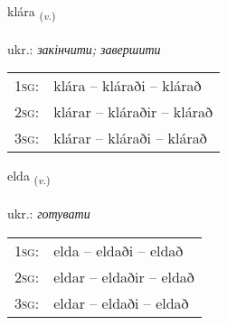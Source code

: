 \documentclass[frontgrid, backgrid]{flacards}\usepackage[]{graphicx}\usepackage[]{xcolor}
\begin{document}
\renewcommand{\flhead}{\vskip5pt \fboxsep=0pt {\small\bfseries\footnotesize Sagnorð | дієслово}}
\renewcommand{\fcfoot}{\vskip5pt \fboxsep=0pt \hspace{2pt}{\small\bfseries\footnotesize 2K}}

\renewcommand{\blhead}{\vskip5pt {\small\bfseries\footnotesize Sagnorð | дієслово }}
\renewcommand{\bcfoot}{\vskip5pt \hspace{2pt}{\small\bfseries\footnotesize 2K}}


{klára \small{\textsubscript{(\textit{v.})}} \\[1ex] %
\textphonetic{[kʰlauːra]} \\
ukr.: \emph{закінчити; завершити} \\  [2ex]
\renewcommand*{\arraystretch}{0.8}
\begin{tabular}{p{1cm}l}
\textsc{1sg}: & klára -- kláraði -- klárað \\ 
\textsc{2sg}: & klárar -- kláraðir -- klárað \\ 
\textsc{3sg}: & klárar -- kláraði -- klárað \\ 
\end{tabular}
}

\renewcommand{\flhead}{\vskip5pt \fboxsep=0pt {\small\bfseries\footnotesize Sagnorð | дієслово}}
\renewcommand{\fcfoot}{\vskip5pt \fboxsep=0pt \hspace{2pt}{\small\bfseries\footnotesize 2K}}

\renewcommand{\blhead}{\vskip5pt {\small\bfseries\footnotesize Sagnorð | дієслово }}
\renewcommand{\bcfoot}{\vskip5pt \hspace{2pt}{\small\bfseries\footnotesize 2K}}


{elda \small{\textsubscript{(\textit{v.})}} \\[1ex] %
\textphonetic{[ɛlta]} \\
ukr.: \emph{готувати} \\  [2ex]
\renewcommand*{\arraystretch}{0.8}
\begin{tabular}{p{1cm}l}
\textsc{1sg}: & elda -- eldaði -- eldað \\ 
\textsc{2sg}: & eldar -- eldaðir -- eldað \\ 
\textsc{3sg}: & eldar -- eldaði -- eldað \\ 
\end{tabular}
}
\end{document}
